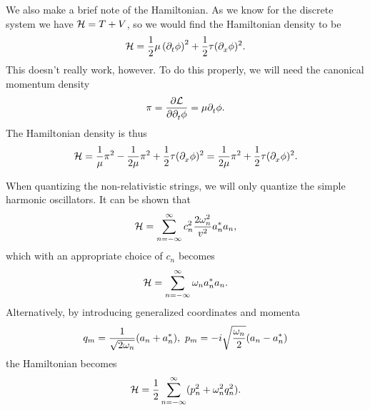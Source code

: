 We also make a brief note of the Hamiltonian. As we know for the discrete system we have $\mathcal{H} = T + V$, so we would find the Hamiltonian density to be
\begin{align*}
	\mathcal{H} = \frac{1}{2}\mu\left(\partial^{}_{t}\phi\right)^{2} + \frac{1}{2}\tau(\partial^{}_{x}\phi)^{2}.
\end{align*}
This doesn't really work, however. To do this properly, we will need the canonical momentum density
\begin{align*}
	\pi = \pdv{\ensuremath{\mathcal{L}}}{\partial^{}_{t}\phi} = \mu\partial^{}_{t}\phi.
\end{align*}
The Hamiltonian density is thus
\begin{align*}
	\mathcal{H} = \frac{1}{\mu}\pi^{2} - \frac{1}{2\mu}\pi^{2} + \frac{1}{2}\tau(\partial^{}_{x}\phi)^{2} = \frac{1}{2\mu}\pi^{2} + \frac{1}{2}\tau(\partial^{}_{x}\phi)^{2}.
\end{align*}

When quantizing the non-relativistic strings, we will only quantize the simple harmonic oscillators. It can be shown that
\begin{align*}
	\mathcal{H} = \sum\limits_{n = -\infty}^{\infty}c_{n}^{2}\frac{2\omega_{n}^{2}}{v^{2}}a^{*}_{n}a_{n},
\end{align*}
which with an appropriate choice of $c_{n}$ becomes
\begin{align*}
	\mathcal{H} = \sum\limits_{n = -\infty}^{\infty}\omega_{n}a^{*}_{n}a_{n}.
\end{align*}
Alternatively, by introducing generalized coordinates and momenta
\begin{align*}
	q_{m} = \frac{1}{\sqrt{2\omega_{n}}}(a_{n} + a^{*}_{n}),\ p_{m} = -i\sqrt{\frac{\omega_{n}}{2}}(a_{n} - a^{*}_{n})
\end{align*}
the Hamiltonian becomes
\begin{align*}
	\mathcal{H} = \frac{1}{2}\sum\limits_{n = -\infty}^{\infty}(p_{n}^{2} + \omega_{n}^{2}q_{n}^{2}).
\end{align*}

